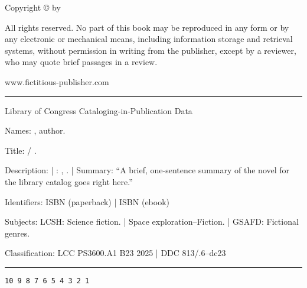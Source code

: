 \thispagestyle{empty}
\vspace*{1in}

Copyright © \publicationyear{} by \authorname

All rights reserved. No part of this book may be reproduced in any form or by any electronic or mechanical means, including information storage and retrieval systems, without permission in writing from the publisher, except by a reviewer, who may quote brief passages in a review.

\vspace{0.5in}

\publisher
\publishercity
www.fictitious-publisher.com

\vspace{0.5in}

\hrule
\vspace{0.1in}
\begin{small}
\noindent Library of Congress Cataloging-in-Publication Data
\vspace{0.2in}

\noindent Names: \authorname, author.
\vspace{0.1in}

\noindent Title: \booktitle / \authorname.
\vspace{0.1in}

\noindent Description: \publicationyear{} | \publishercity: \publisher, \publicationyear{}. | Summary: “A brief, one-sentence summary of the novel for the library catalog goes right here.”
\vspace{0.1in}

\noindent Identifiers: ISBN \isbnpaperback{} (paperback) | ISBN \isbnebook{} (ebook)
\vspace{0.1in}

\noindent Subjects: LCSH: Science fiction. | Space exploration--Fiction. | GSAFD: Fictional genres. %
\vspace{0.1in}

\noindent Classification: LCC PS3600.A1 B23 2025 | DDC 813/.6--dc23
\end{small}
\vspace{0.1in}
\hrule

\vfill

\begin{center}
\texttt{10 9 8 7 6 5 4 3 2 1}
\end{center}

\cleardoublepage
